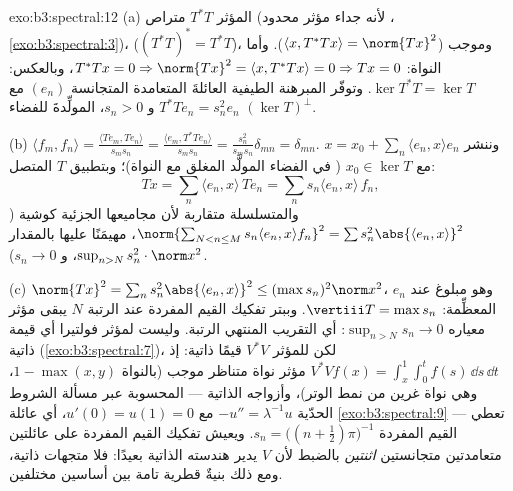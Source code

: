 \begin{solution}{exo:b3:spectral:12}
(a) المؤثر $T^*T$ متراص (لأنه جداء مؤثر محدود ،
\cref{exo:b3:spectral:3})،  ($(T^*T)^* = T^*T$)، وموجب ($\langle x, T^*Tx\rangle =
\norm{Tx}^2$). وأما
النواة: $T^*Tx = 0 \Rightarrow \norm{Tx}^2 =
\langle x, T^*Tx\rangle = 0 \Rightarrow Tx = 0$، وبالعكس: $\ker T^*T = \ker T$. وتوفّر المبرهنة الطيفية
العائلةَ المتعامدة المتجانسة $(e_n)$ مع $T^*Te_n = s_n^2e_n$ و $s_n > 0$،
المولِّدةَ للفضاء $(\ker T)^\perp$.

(b) $\langle f_m, f_n\rangle = \frac{\langle Te_m,
Te_n\rangle}{s_ms_n} = \frac{\langle e_m,
T^*Te_n\rangle}{s_ms_n} = \frac{s_n^2}{s_ms_n}\delta_{mn} =
\delta_{mn}$. وننشر $x = x_0 + \sum_n\langle e_n, x\rangle
e_n$ مع $x_0 \in \ker T$ ( في
الفضاء المولَّد المغلق مع النواة)؛ وبتطبيق $T$ المتصل:
\[
Tx = \sum_n\langle e_n, x\rangle\,Te_n =
\sum_ns_n\langle e_n, x\rangle\,f_n,
\]
والمتسلسلة متقاربة لأن مجاميعها الجزئية كوشية ($\norm{\sum_{N<n\leq M}s_n\langle e_n, x\rangle f_n}^2 =
\sum s_n^2\abs{\langle e_n, x\rangle}^2$،
مهيمَنًا عليها بالمقدار $\sup_{n>N}s_n^2\cdot\norm x^2$، و $s_n \to 0$).

(c) $\norm{Tx}^2 = \sum_ns_n^2\abs{\langle e_n, x\rangle}^2
\leq (\max s_n)^2\norm x^2$، وهو مبلوغ عند $e_n$ المعظِّمة: $\vertiii T = \max s_n$. وببتر
تفكيك القيم المفردة عند الرتبة $N$ يبقى مؤثر معياره $\sup_{n>N}s_n \to 0$: أي
التقريب المنتهي الرتبة. وليست لمؤثر فولتيرا أي قيمة ذاتية
(\cref{exo:b3:spectral:7})، لكن للمؤثر $V^*V$ قيمًا ذاتية: إذ $V^*Vf(x) = \int_x^1\int_0^tf(s)\,\dd s\,\dd t$ مؤثر
نواة متناظر موجب (بالنواة $1 - \max(x,y)$، وهي نواة غرين من
نمط الوتر)، وأزواجه الذاتية --- المحسوبة عبر مسألة الشروط
الحدّية $-u'' = \lambda^{-1}u$ مع $u'(0)
= u(1) = 0$، أي عائلة \cref{exo:b3:spectral:9} --- تعطي القيم
المفردة $s_n = \bigl((n + \frac12)\pi\bigr)^{-1}$. ويعيش تفكيك القيم المفردة على عائلتين
متعامدتين متجانستين \emph{اثنتين} بالضبط لأن $V$ يدير هندسته
الذاتية بعيدًا: فلا متجهات ذاتية، ومع ذلك بنيةٌ قطرية تامة بين
أساسين مختلفين.
\end{solution}

